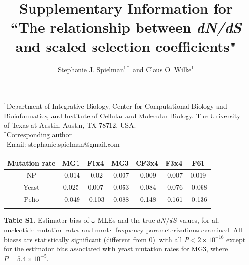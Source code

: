 \documentclass[11pt]{article}
\begin{document}
\title{\textbf{Supplementary Information for ``The relationship between \emph{dN/dS} and scaled selection coefficients"}}
\author{Stephanie J. Spielman$^{1*}$  and Claus O. Wilke$^{1}$}
\date{}
\maketitle
\noindent$^1$Department of Integrative Biology, Center for Computational Biology and Bioinformatics, and Institute of Cellular and Molecular Biology.
The University of Texas at Austin, Austin, TX 78712, USA.\\

\bigskip
\noindent
$^*$Corresponding author\\
$\phantom{^*}$Email: stephanie.spielman@gmail.com\\

\vspace{3cm}


\begin{table}[htbp]
	\begin{tabular}{c c c c c c c}
		\hline\noalign{\smallskip}
		Mutation rate & MG1 & F1x4 & MG3 & CF3x4 & F3x4 & F61 \\
		\hline\noalign{\smallskip}
		NP & -0.014 & -0.02 & -0.007 & -0.009 & -0.007 & 0.019 \\ 
		Yeast & 0.025 & 0.007 & -0.063 & -0.084 & -0.076 & -0.068 \\ 
		Polio & -0.049 & -0.103 & -0.088 & -0.148 & -0.161 & -0.136 \\ 
		\noalign{\smallskip}\hline\noalign{\smallskip}
	\end{tabular}
\end{table}	
\noindent \textbf{Table S1.} Estimator bias of $\omega$ MLEs and the true $dN/dS$ values, for all nucleotide mutation rates and model frequency parameterizations examined. All biases are statistically significant (different from 0), with all $P < 2\times10^{-16}$ except for the estimator bias associated with yeast mutation rates for MG3, where $P = 5.4\times10^{-5}$.



\vspace{2.5cm}
\end{document}
